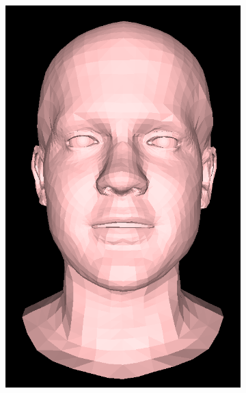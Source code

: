 \begin{figure}[h!]
\begin{subfigure}[b]{0.19\textwidth}
        \includegraphics[width=\textwidth]{figures/gen_sample/00027.png}
    \end{subfigure}
    \begin{subfigure}[b]{0.19\textwidth}

\end{subfigure}
\end{figure}
